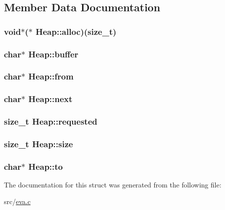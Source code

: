 \subsection{Member Data Documentation}
\hypertarget{struct_heap_aa61a133febb2dd305213dfefba14e8dc}{
\subsubsection[{alloc}]{\setlength{\rightskip}{0pt plus 5cm}void$\ast$($\ast$ Heap\-::alloc)(size\-\_\-t)}}\label{struct_heap_aa61a133febb2dd305213dfefba14e8dc}
\hypertarget{struct_heap_a1debcfa580a04f58ac2c61b07f303598}{
\subsubsection[{buffer}]{\setlength{\rightskip}{0pt plus 5cm}char$\ast$ Heap\-::buffer}}\label{struct_heap_a1debcfa580a04f58ac2c61b07f303598}
\hypertarget{struct_heap_a8f8f5e1fd56997662075844c57a35631}{
\subsubsection[{from}]{\setlength{\rightskip}{0pt plus 5cm}char$\ast$ Heap\-::from}}\label{struct_heap_a8f8f5e1fd56997662075844c57a35631}
\hypertarget{struct_heap_a1b1caa1636af47accf1716629aecc7a0}{
\subsubsection[{next}]{\setlength{\rightskip}{0pt plus 5cm}char$\ast$ Heap\-::next}}\label{struct_heap_a1b1caa1636af47accf1716629aecc7a0}
\hypertarget{struct_heap_a5918805e8b229498a184496a7ca16b38}{
\subsubsection[{requested}]{\setlength{\rightskip}{0pt plus 5cm}size\-\_\-t Heap\-::requested}}\label{struct_heap_a5918805e8b229498a184496a7ca16b38}
\hypertarget{struct_heap_a2ed455b269f1a100c7130d6a7eb871a9}{
\subsubsection[{size}]{\setlength{\rightskip}{0pt plus 5cm}size\-\_\-t Heap\-::size}}\label{struct_heap_a2ed455b269f1a100c7130d6a7eb871a9}
\hypertarget{struct_heap_aa99e63afb13d2a29913cd8a8198c41f2}{
\subsubsection[{to}]{\setlength{\rightskip}{0pt plus 5cm}char$\ast$ Heap\-::to}}\label{struct_heap_aa99e63afb13d2a29913cd8a8198c41f2}


The documentation for this struct was generated from the following file\-:\begin{DoxyCompactItemize}
\item 
src/\hyperlink{eva_8c}{eva.\-c}\end{DoxyCompactItemize}
